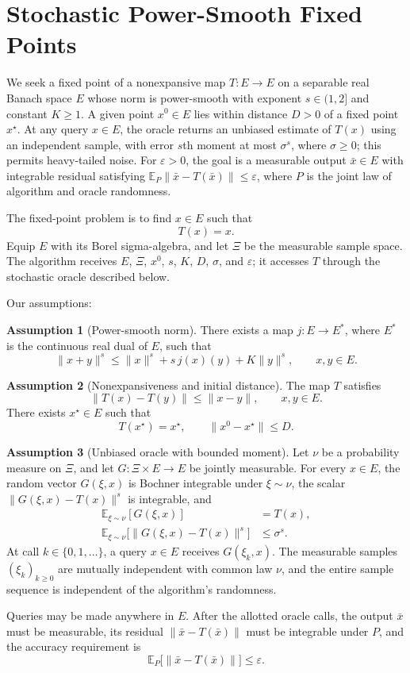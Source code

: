 \documentclass[10pt]{article}
\theoremstyle{definition}
\newtheorem{assumption}{Assumption}
\begin{document}
\section*{Stochastic Power-Smooth Fixed Points}
We seek a fixed point of a nonexpansive map $T:E\to E$ on a separable real Banach space $E$ whose norm is power-smooth with exponent $s\in(1,2]$ and constant $K\geq1$. A given point $x^0\in E$ lies within distance $D>0$ of a fixed point $x^\star$. At any query $x\in E$, the oracle returns an unbiased estimate of $T(x)$ using an independent sample, with error $s$th moment at most $\sigma^s$, where $\sigma\geq0$; this permits heavy-tailed noise. For $\varepsilon>0$, the goal is a measurable output $\bar{x}\in E$ with integrable residual satisfying $\mathbb{E}_{P}\|\bar{x}-T(\bar{x})\|\leq\varepsilon$, where $P$ is the joint law of algorithm and oracle randomness.

The fixed-point problem is to find $x\in E$ such that
\[
T(x)=x.
\]
Equip $E$ with its Borel sigma-algebra, and let $\Xi$ be the measurable sample space. The algorithm receives $E$, $\Xi$, $x^0$, $s$, $K$, $D$, $\sigma$, and $\varepsilon$; it accesses $T$ through the stochastic oracle described below.

Our assumptions:
\begin{assumption}[Power-smooth norm]
There exists a map $j:E\to E^*$, where $E^*$ is the continuous real dual of $E$, such that
\[
\|x+y\|^s\leq\|x\|^s+s\,j(x)(y)+K\|y\|^s,
\qquad x,y\in E.
\]
\end{assumption}

\begin{assumption}[Nonexpansiveness and initial distance]
The map $T$ satisfies
\[
\|T(x)-T(y)\|\leq\|x-y\|,
\qquad x,y\in E.
\]
There exists $x^\star\in E$ such that
\[
T(x^\star)=x^\star,
\qquad \|x^0-x^\star\|\leq D.
\]
\end{assumption}

\begin{assumption}[Unbiased oracle with bounded moment]
Let $\nu$ be a probability measure on $\Xi$, and let $G:\Xi\times E\to E$ be jointly measurable. For every $x\in E$, the random vector $G(\xi,x)$ is Bochner integrable under $\xi\sim\nu$, the scalar $\|G(\xi,x)-T(x)\|^s$ is integrable, and
\[
\begin{aligned}
\mathbb{E}_{\xi\sim\nu}[G(\xi,x)]&=T(x),\\
\mathbb{E}_{\xi\sim\nu}\bigl[\|G(\xi,x)-T(x)\|^s\bigr]&\leq\sigma^s.
\end{aligned}
\]
At call $k\in\{0,1,\ldots\}$, a query $x\in E$ receives $G(\xi_k,x)$. The measurable samples $(\xi_k)_{k\geq0}$ are mutually independent with common law $\nu$, and the entire sample sequence is independent of the algorithm's randomness.
\end{assumption}

Queries may be made anywhere in $E$. After the allotted oracle calls, the output $\bar{x}$ must be measurable, its residual $\|\bar{x}-T(\bar{x})\|$ must be integrable under $P$, and the accuracy requirement is
\[
\mathbb{E}_{P}\bigl[\|\bar{x}-T(\bar{x})\|\bigr]\leq\varepsilon.
\]
\end{document}
